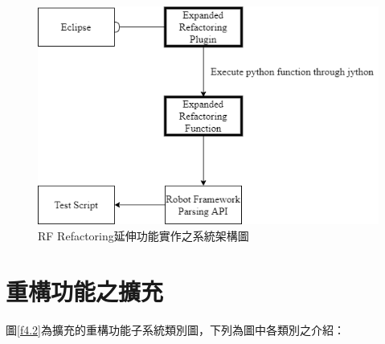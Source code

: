 \begin{figure}[H]
    \centering
    \includegraphics[width=1.0\textwidth]{picture/ch4/System_structure.png}
    \caption{RF Refactoring延伸功能實作之系統架構圖}
    \label{f4.1}
\end{figure}
\newpage

\section{重構功能之擴充}\label{s4.2}
\indent
圖\ref{f4.2}為擴充的重構功能子系統類別圖，下列為圖中各類別之介紹：


